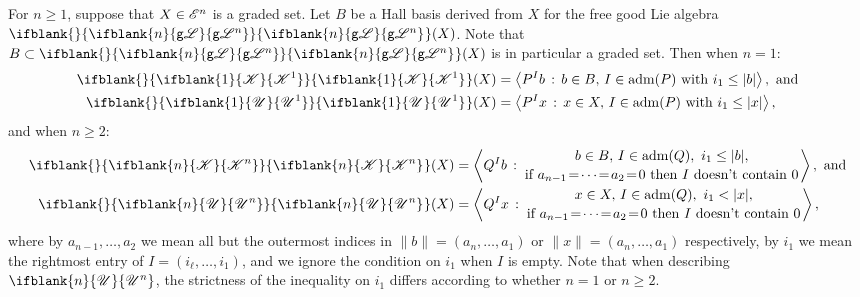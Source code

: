 \documentclass[10pt]{article}
\newcommand{\GS}[1]{\scrE^{#1}}
\newcommand{\GoodLie}[1]%
{\ifblank{#1}{\mathsf{g}{\scrL}}{\mathsf{g}{\scrL}^{#1}}}
\newcommand{\LL}[1]{\ifblank{#1}{\scrK}{\scrK^{#1}}}
\newcommand{\nontop}[1]{\ifblank{#1}{\scrU}{\scrU^{#1}}}
\newcommand{\admis}[1]{\mathrm{adm}(#1)}%
\newcommand{\Fr}[2][]{\ifblank{#1}{#2}{#2_{#1}}}
\renewcommand{\Q}{Q}
\begin{document}
\begin{CategoriesOfInterest}
\begin{prop}\label{PropFreeKandUconstructions}
For $n\geq1$, suppose that $X\in\GS{n}$ is a graded set. Let $B$ be a Hall basis derived from $X$ for the free good Lie algebra $\Fr{\GoodLie{n}}(X)$. Note that $B\subset \Fr{\GoodLie{n}}(X)$ is in particular a graded set. Then when $n=1$:
\begin{alignat*}{2}
{\Fr{\LL{1}}(X)}
&=
\left\langle P^Ib\,:\,b\in B,\,I\in\admis{P}\textup{ with }i_1\leq|b|  \right\rangle,\textup{ and}%
\\
{\Fr{\nontop{1}}(X)}
&=
\left\langle P^Ix\,:\,x\in X,\,I\in\admis{P}\textup{ with }i_1\leq|x|\right\rangle,%
\end{alignat*}
and when $n\geq2$:
\begin{alignat*}{2}
{\Fr{\LL{n}}(X)}
&=
\left\langle \Q^Ib\,:\,\genfrac{}{}{0pt}{}{b\in B,\,I\in\admis{\Q},\ i_1\leq|b|,}{\textup{if }a_{n-1}\!=\!\cdots\!=\!a_2\!=\!0\textup{ then $I$ doesn't contain 0}}\right\rangle,\textup{ and}%
\\
{\Fr{\nontop{n}}(X)}
&=
\left\langle \Q^Ix\,:\,\genfrac{}{}{0pt}{}{x\in X,\,I\in\admis{\Q},\ i_1<|x|,}{\textup{if }a_{n-1}\!=\!\cdots\!=\!a_2\!=\!0\textup{ then $I$ doesn't contain 0}}\right\rangle,%
\end{alignat*}
where by $a_{n-1},\ldots,a_2$ we mean all but the outermost indices in $\|b\|=(a_{n},\ldots,a_1)$ or $\|x\|=(a_{n},\ldots,a_1)$ respectively, by $i_1$ we mean the rightmost entry of $I=(i_\ell,\ldots,i_1)$, and we ignore the condition on $i_1$ when $I$ is empty. Note that when describing  $\nontop{n}$, the strictness of the inequality on $i_1$ differs according to whether $n=1$ or $n\geq2$.
\end{prop}

\end{CategoriesOfInterest}
\end{document}
